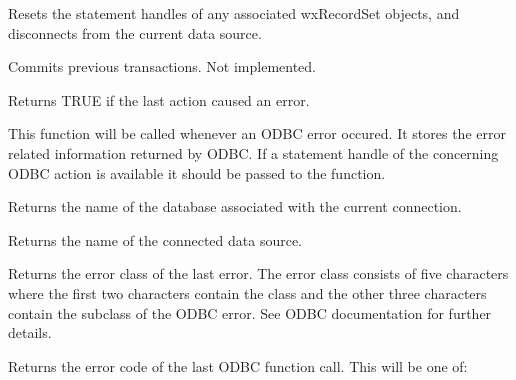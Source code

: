 

Resets the statement handles of any associated wxRecordSet objects,
and disconnects from the current data source.



Commits previous transactions. Not implemented.



Returns TRUE if the last action caused an error.



This function will be called whenever an ODBC error occured. It stores the
error related information returned by ODBC. If a statement handle of the
concerning ODBC action is available it should be passed to the function.



Returns the name of the database associated with the current connection.



Returns the name of the connected data source.



Returns the error class of the last error. The error class consists of
five characters where the first two characters contain the class
and the other three characters contain the subclass of the ODBC error.
See ODBC documentation for further details.



Returns the error code of the last ODBC function call. This will be one of:

\begin{twocollist}\itemsep=0pt
\end{twocollist}

